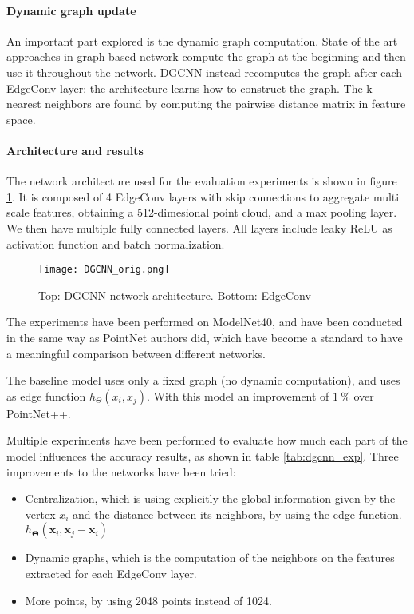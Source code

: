 \paragraph{Dynamic graph update}
An important part explored is the dynamic graph computation.
State of the art approaches in graph based network compute the graph at the beginning and then use it throughout the network. DGCNN instead recomputes the graph after each EdgeConv layer: the architecture learns how to construct the graph.
The k-nearest neighbors are found by computing the pairwise distance matrix in feature space.

\paragraph{Architecture and results}

The network architecture used for the evaluation experiments is shown in figure \ref{fig:DGCNN}. It is composed of 4 EdgeConv layers with skip connections to aggregate multi scale features, obtaining a 512-dimesional point cloud, and a max pooling layer. We then have multiple fully connected layers. All layers include leaky ReLU as activation function and batch normalization.

\begin{figure}[ht]
    \centering
    \texttt{[image: DGCNN\_orig.png]}
    \caption{Top: DGCNN network architecture. Bottom: EdgeConv}
    \label{fig:DGCNN}
\end{figure}

The experiments have been performed on ModelNet40, and have been conducted in the same way as PointNet authors did, which have become a standard to have a meaningful comparison between different networks.

The baseline model uses only a fixed graph (no dynamic computation), and uses as edge function $ h_{\Theta}(x_i, x_j)$. With this model an improvement of $\SI{1}{\percent}$ over PointNet++.

Multiple experiments have been performed to evaluate how much each part of the model influences the accuracy results, as shown in table \ref{tab:dgcnn_exp}.
Three improvements to the networks have been tried:

\begin{itemize}
    \item Centralization, which is using explicitly the global information given by the vertex $x_i$ and the distance between its neighbors, by using the edge function. ${h}_{\mathbf{\Theta}}\left(\mathbf{x}_{i}, \mathbf{x}_{j}-\mathbf{x}_{i}\right)$
    \item Dynamic graphs, which is the computation of the neighbors on the features extracted for each EdgeConv layer.
    \item More points, by using 2048 points instead of 1024.
\end{itemize}

